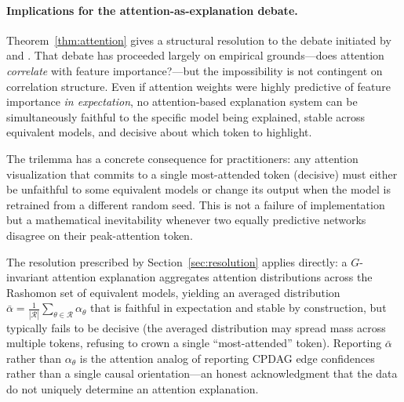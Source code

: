 \paragraph{Implications for the attention-as-explanation debate.}
Theorem~\ref{thm:attention} gives a structural resolution to the debate
initiated by \citet{jainwallace2019} and \citet{wiegreffe2019attention}.
That debate has proceeded largely on empirical grounds---does attention
\emph{correlate} with feature importance?---but the impossibility is not
contingent on correlation structure.  Even if attention weights were highly
predictive of feature importance \emph{in expectation}, no attention-based
explanation system can be simultaneously faithful to the specific model
being explained, stable across equivalent models, and decisive about which
token to highlight.

The trilemma has a concrete consequence for practitioners: any attention
visualization that commits to a single most-attended token (decisive) must
either be unfaithful to some equivalent models or change its output when
the model is retrained from a different random seed.  This is not a
failure of implementation but a mathematical inevitability whenever two
equally predictive networks disagree on their peak-attention token.

The resolution prescribed by Section~\ref{sec:resolution} applies directly:
a $G$-invariant attention explanation aggregates attention distributions
across the Rashomon set of equivalent models, yielding an averaged
distribution $\bar{\alpha} = \frac{1}{|\mathcal{R}|}\sum_{\theta \in \mathcal{R}} \alpha_\theta$
that is faithful in expectation and stable by construction, but typically
fails to be decisive (the averaged distribution may spread mass across
multiple tokens, refusing to crown a single ``most-attended'' token).
Reporting $\bar{\alpha}$ rather than $\alpha_{\theta}$ is the attention
analog of reporting CPDAG edge confidences rather than a single causal
orientation---an honest acknowledgment that the data do not uniquely
determine an attention explanation.
